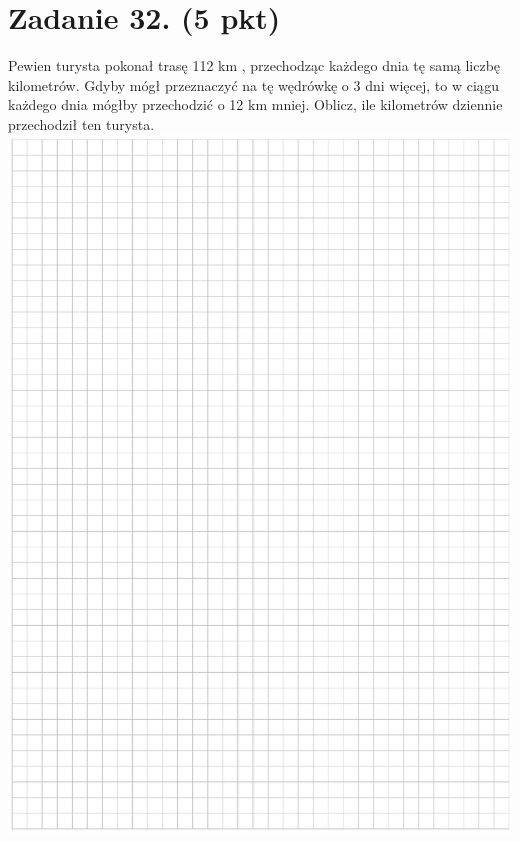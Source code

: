 \documentclass[10pt]{article}
\begin{document}
\section*{Zadanie 32. (5 pkt)}
Pewien turysta pokonał trasę 112 km , przechodząc każdego dnia tę samą liczbę kilometrów. Gdyby mógł przeznaczyć na tę wędrówkę o 3 dni więcej, to w ciągu każdego dnia mógłby przechodzić o 12 km mniej. Oblicz, ile kilometrów dziennie przechodził ten turysta.\\
\includegraphics[max width=\textwidth, center]{2024_11_21_5b6b7ffa9006e3f448adg-16}\\
\end{document}
